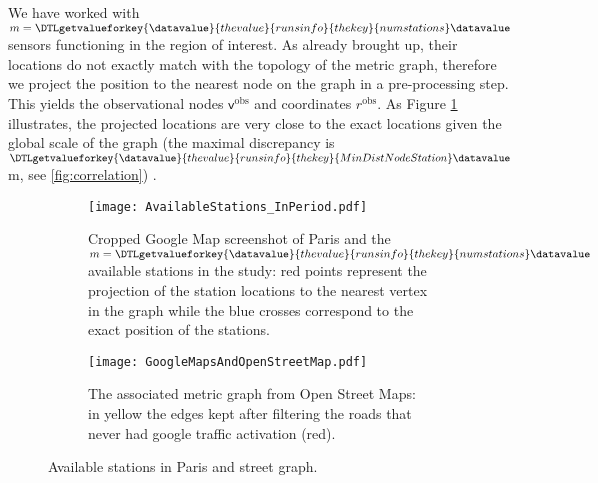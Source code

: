 \documentclass[11pt,a4paper,twoside]{article}
\newcommand{\perplexityinsert}[1]{\DTLgetvalueforkey{\datavalue}{thevalue}{runsinfo}{thekey}{#1}\datavalue}
\theoremstyle{definition}
\numberwithin{equation}{section}
\newcommand{\bR}{\ensuremath{\mathbb{R}}}
\newcommand{\vv}{\ensuremath{\textsf{v}}}
\newcommand{\<}{\langle}
\renewcommand{\>}{\rangle}
\newcommand{\obs}{\ensuremath{\text{obs}}}
\newcommand{\asmodif}[2]{{\color{teal} #1} {\sout{#2}}}
\begin{document}
We have worked with $m=\perplexityinsert{numstations}$ sensors functioning in the region of interest. As already brought up, their locations do not exactly match with the topology of the metric graph, therefore we project the position to the nearest node on the graph in a pre-processing step. This yields the observational nodes $\vv^\obs$ and coordinates $r^\obs$. As Figure \ref{fig:paris-stations} illustrates, the projected locations are very close to the exact locations given the global scale of the graph \asmodif{(the maximal discrepancy is $\perplexityinsert{MinDistNodeStation}$m, see \cref{fig:correlation})}{}. %


\begin{figure}
      \centering
      \begin{subfigure}[b]{0.48\textwidth}
          \centering
          \texttt{[image: AvailableStations\_InPeriod.pdf]}
          \caption{Cropped Google Map screenshot of Paris and the $m=\perplexityinsert{numstations}$ available stations in the study: red points represent the projection of the station locations to the nearest vertex in the graph while the blue crosses correspond to the exact position of the stations.}
          \label{fig:paris-stations}
      \end{subfigure}
      \hfill
      \begin{subfigure}[b]{0.48\textwidth}
          \centering
          \texttt{[image: GoogleMapsAndOpenStreetMap.pdf]}
          \caption{The associated metric graph from Open Street Maps: in yellow the edges kept after filtering the roads that never had google traffic activation (red).}
          \label{fig:paris-graph}
      \end{subfigure}
      \caption{Available stations in Paris and street graph.}
      \label{fig:stations-graph}
 \end{figure}


\end{document}
